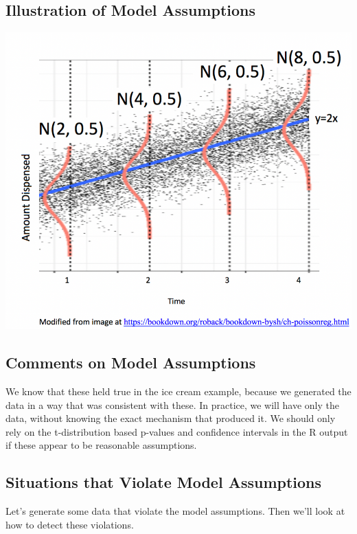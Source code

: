 \documentclass[]{book}
\begin{document}
\subsection{Illustration of Model
Assumptions}\label{illustration-of-model-assumptions}

\includegraphics[width=0.5\linewidth]{SLR_Model_Assumptions}

\subsection{Comments on Model
Assumptions}\label{comments-on-model-assumptions}

We know that these held true in the ice cream example, because we
generated the data in a way that was consistent with these. In practice,
we will have only the data, without knowing the exact mechanism that
produced it. We should only rely on the t-distribution based p-values
and confidence intervals in the R output if these appear to be
reasonable assumptions.

\subsection{Situations that Violate Model
Assumptions}\label{situations-that-violate-model-assumptions}

Let's generate some data that violate the model assumptions. Then we'll
look at how to detect these violations.
\end{document}

